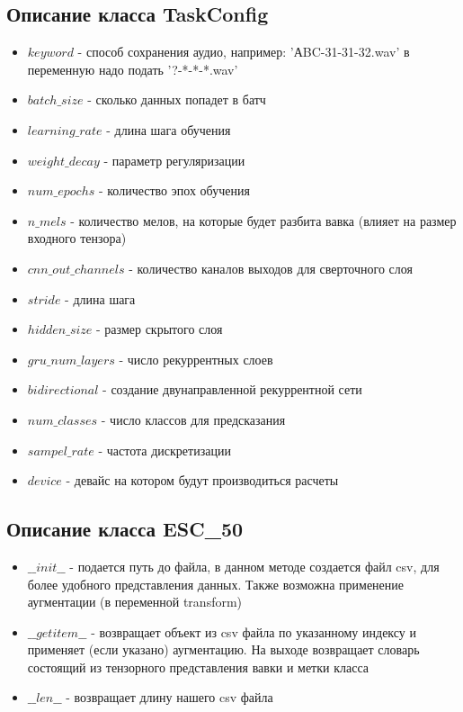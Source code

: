 \documentclass[a4paper,12pt]{article}
\begin{document}
 	\subsection{Описание класса TaskConfig}\label{TaskConfig}
 		\begin{itemize}
 		\item $keyword$ - способ сохранения аудио, например: 'АBC-31-31-32.wav' в переменную надо подать '?-*-*-*.wav'
 		\item $batch\_size$ - сколько данных попадет в батч
 		\item $learning\_rate$ - длина шага обучения
 		\item $weight\_decay$ - параметр регуляризации
 		\item $num\_epochs$ - количество эпох обучения
 		\item $n\_mels$ - количество мелов, на которые будет разбита вавка (влияет на размер входного тензора)
 		\item $cnn\_out\_channels$ - количество каналов выходов для сверточного слоя
 		\item $stride$ - длина шага
 		\item $hidden\_size$ - размер скрытого слоя
 		\item $gru\_num\_layers$ - число рекуррентных слоев
 		\item $bidirectional$ - создание двунаправленной рекуррентной сети
 		\item $num\_classes$ - число классов для предсказания
 		\item $sampel\_rate$ - частота дискретизации
 		\item $device$ - девайс на котором будут производиться расчеты
 	\end{itemize}
 	
 	\subsection{Описание класса ESC\_50}\label{ESC50}
 		\begin{itemize}
 		\item $\_\_init\_\_$ - подается путь до файла, в данном методе создается файл csv, для более удобного представления данных. Также возможна применение аугментации (в переменной transform)
 		\item $\_\_getitem\_\_$ - возвращает объект из csv файла по указанному индексу и применяет (если указано) аугментацию. На выходе возвращает словарь состоящий из тензорного представления вавки и метки класса
 		\item $\_\_len\_\_$ - возвращает длину нашего csv файла
 	\end{itemize}
\end{document}
